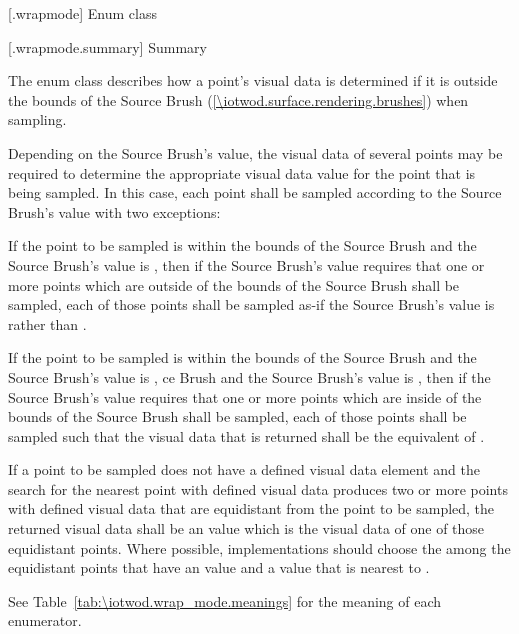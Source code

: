  [\iotwod.wrapmode] {Enum class }

 [\iotwod.wrapmode.summary] { Summary}

\pnum
The  enum class describes how a point's visual data is 
determined if it is outside the bounds of the Source Brush (\ref{\iotwod.surface.rendering.brushes}) when sampling.

\pnum
Depending on the Source Brush's  value, the visual data of several points may be required to determine the appropriate visual data value for the point that is being sampled. In this case, each point shall be sampled according to the Source Brush's  value with two exceptions:
\begin{enumeratea}
\item If the point to be sampled is within the bounds of the Source Brush and the Source Brush's  value is , then if the Source Brush's  value requires that one or more points which are outside of the bounds of the Source Brush shall be sampled, each of those points shall be sampled as-if the Source Brush's  value is  rather than .
\item If the point to be sampled is within the bounds of the Source Brush and the Source Brush's  value is , ce Brush and the Source Brush's  value is , then if the Source Brush's  value requires that one or more points which are inside of the bounds of the Source Brush shall be sampled, each of those points shall be sampled such that the visual data that is returned shall be the equivalent of .
\end{enumeratea}

\pnum
If a point to be sampled does not have a defined visual data element and the search for the nearest point with defined visual data produces two or more points with defined visual data that are equidistant from the point to be sampled, the returned visual data shall be an \unspecnorm value which is the visual data of one of those equidistant points. Where possible, implementations should choose the among the equidistant points that have an \xaxis value and a \yaxis value that is nearest to .

\pnum
See Table~\ref{tab:\iotwod.wrap_mode.meanings} for the meaning of each  enumerator.

